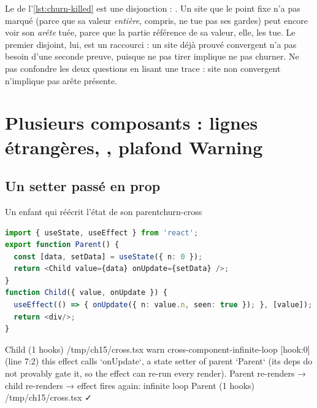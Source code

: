 \begin{piege}
Le  de l'\cref{lst:churn-killed} est une disjonction :
. Un site que le
point fixe n'a pas marqué (parce que sa valeur \emph{entière},  compris, ne tue
pas ses gardes) peut encore voir son \emph{arête} tuée, parce que la partie référence de sa
valeur, elle, les tue. Le premier disjoint, lui, est un raccourci : un site déjà prouvé
convergent n'a pas besoin d'une seconde preuve, puisque ne pas tirer implique ne pas
churner. Ne pas confondre les deux questions en lisant une trace : \og site non
convergent\fg{} n'implique pas \og arête présente\fg.
\end{piege}

\section[Plusieurs composants]{Plusieurs composants : lignes étrangères, , plafond Warning}
\label{sec:churn-cross}

\subsection{Un setter passé en prop}

\begin{exemple}{Un enfant qui réécrit l'état de son parent}{churn-cross}
\begin{lstlisting}[language=TypeScript,caption={\file{/tmp/ch15/cross.tsx}},label={lst:churn-cross}]
import { useState, useEffect } from 'react';
export function Parent() {
  const [data, setData] = useState({ n: 0 });
  return <Child value={data} onUpdate={setData} />;
}
function Child({ value, onUpdate }) {
  useEffect(() => { onUpdate({ n: value.n, seen: true }); }, [value]);
  return <div/>;
}
\end{lstlisting}
\begin{sortie}
  Child  (1 hooks)  /tmp/ch15/cross.tsx
    warn   cross-component-infinite-loop  [hook:0]  (line 7:2)  this effect calls `onUpdate`, a state setter of parent `Parent` (its deps do not provably gate it, so the effect can re-run every render). Parent re-renders → child re-renders → effect fires again: infinite loop
  Parent  (1 hooks)  /tmp/ch15/cross.tsx  ✓
\end{sortie}
\end{exemple}

